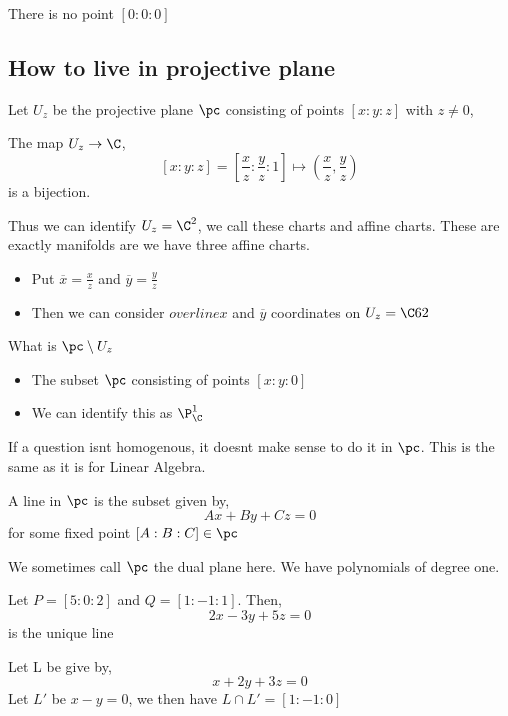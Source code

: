 \documentclass{article}
\begin{document}
\begin{remark}
 There is no point $[0 : 0 : 0]$
\end{remark}

\subsection{How to live in projective plane}
Let $U_z$ be the projective plane $\pc$ consisting of points $[x : y: z]$ with $z \ne 0$,

\begin{nlemma}[]
  The map $U_z \to \C$,
  $$ [x : y: z] = \left[\frac{x}{z} : \frac{y}{z} : 1\right] \mapsto (\frac{x}{z}, \frac{y}{z}) $$
  is a bijection.
\end{nlemma}
Thus we can identify $U_z = \C^2$, we call these charts and affine charts. These are exactly manifolds are we have three affine charts.

\begin{itemize}
  \item Put $\overline x = \frac{x}{z}$ and $\overline y = \frac{y}{z}$
  \item Then we can consider $overline
  x$ and $\overline y$ coordinates on $U_z = \C62$
\end{itemize}

\begin{question}
  What is $\pc \setminus U_z$
\end{question}
\begin{itemize}
  \item The subset $\pc$ consisting of points $[ x : y : 0]$
  \item We can identify this as $\P_\C^1$
\end{itemize}
If a question isnt homogenous, it doesnt make sense to do it in $\pc$. This is the same as it is for Linear Algebra.

\begin{ndefi}[Line]
  A line in $\pc$ is the subset given by,
  $$ Ax + By + Cz = 0 $$
  for some fixed point $[A : B : C] \in \pc$
\end{ndefi}
We sometimes call $\pc$ the dual plane here. We have polynomials of degree one.

\begin{eg}
  Let $P = [5 : 0 : 2]$ and $Q = [1:-1:1]$. Then,
  $$ 2x - 3y + 5z = 0 $$
  is the unique line
\end{eg}

\begin{eg}
  Let L be give by,
  $$ x + 2y + 3z = 0 $$
  Let $L'$ be $x - y =0$, we then have $L \cap L' = [1 : -1 : 0]$
\end{eg}
\end{document}
